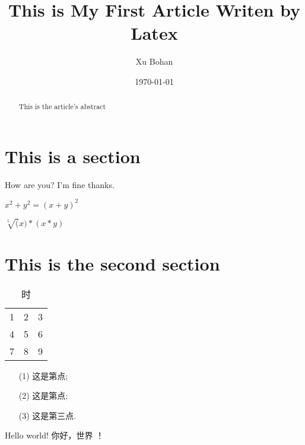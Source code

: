 \documentclass[a4paper]{article}
\title{This is My First Article Writen by Latex}
\author{Xu Bohan}
\date{\today}
\begin{document}
\maketitle

\begin{abstract}
    This is the article's abstract
\end{abstract}

\tableofcontents


\section{This is a section}
How are you?
I'm fine thanks.

$x^2+y^2 = (x+y)^2$

$\sqrt[5](x)*(x*y)$
\section{This is the second section}
\begin{table}[htbp]
    \centering
    \caption{时}
    \begin{tabular}{ccc}
        1 & 2 & 3 \\
        4 & 5 & 6 \\
        7 & 8 & 9
    \end{tabular}\label{tab:table}
\end{table}

\begin{enumerate}
    \item[(1)] 这是第点;
    \item[(2)] 这是第点;
    \item[(3)] 这是第三点.
\end{enumerate}

Hello world!
你好，世界 ！
\end{document}
